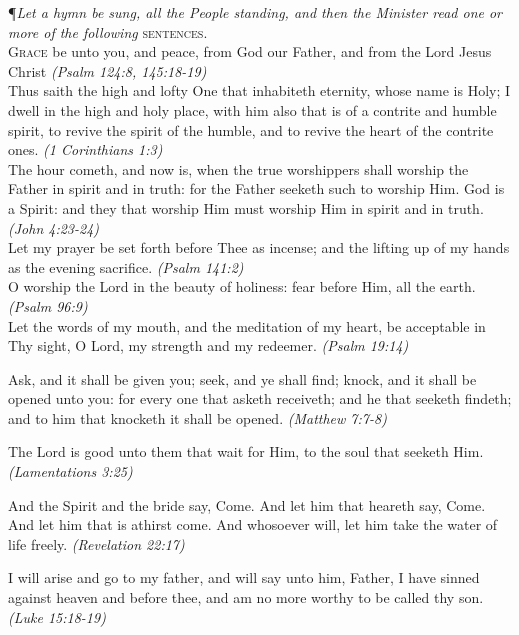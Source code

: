 \noindent\P \textit{Let a hymn be sung, all the People standing, and then the Minister read one or more of the following} \textsc{sentences.} \\

\lettrine{G}{race} be unto you, and peace, from God our Father, and from the Lord Jesus Christ
\textit{(Psalm 124:8, 145:18-19)} \\

Thus saith the high and lofty One that inhabiteth eternity, whose name is Holy; I dwell in the high and holy place, with him also that is of a contrite and humble spirit, to revive the spirit of the humble, and to revive the heart of the contrite ones.
\textit{(1 Corinthians 1:3)} \\

The hour cometh, and now is, when the true worshippers shall worship the Father in spirit and in truth: for the Father seeketh such to worship Him.
God is a Spirit: and they that worship Him must worship Him in spirit and in truth.
\textit{(John 4:23-24)} \\

Let my prayer be set forth before Thee as incense; and the lifting up of my hands as the evening sacrifice.
\textit{(Psalm 141:2)} \\

O worship the Lord in the beauty of holiness: fear before Him, all the earth.
\textit{(Psalm 96:9)} \\

Let the words of my mouth, and the meditation of my heart, be acceptable in Thy sight, O Lord, my strength and my redeemer.
\textit{(Psalm 19:14)}

Ask, and it shall be given you; seek, and ye shall find; knock, and it shall be opened unto you: for every one that asketh receiveth; and he that seeketh findeth; and to him that knocketh it shall be opened.
\textit{(Matthew 7:7-8)}

The Lord is good unto them that wait for Him, to the soul that seeketh Him.
\textit{(Lamentations 3:25)}

And the Spirit and the bride say, Come.
And let him that heareth say, Come.
And let him that is athirst come.
And whosoever will, let him take the water of life freely.
\textit{(Revelation 22:17)}

I will arise and go to my father, and will say unto him, Father, I have sinned against heaven and before thee, and am no more worthy to be called thy son.
\textit{(Luke 15:18-19)}

